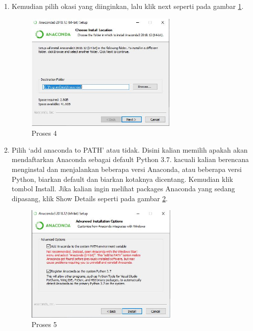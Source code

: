 \begin{itemize}
\begin{enumerate}
\item Kemudian pilih okasi yang diinginkan, lalu klik next seperti pada gambar \ref{gambar4}.
\begin{figure}[ht]
	\centerline{\includegraphics[width=0.70\textwidth]{figures/1/1144124/d.JPG}}
	\caption{Proses 4 }
	\label{gambar4}
\end{figure}

\item Pilih ‘add anaconda to PATH’ atau tidak. Disini kalian memilih apakah akan mendaftarkan Anaconda sebagai default Python 3.7. kacuali kalian berencana menginstal dan menjalankan beberapa versi Anaconda, atau beberapa versi Python, biarkan default dan biarkan kotaknya dicentang. Kemudian klik tombol Install. Jika kalian ingin melihat packages Anaconda yang sedang dipasang, klik Show Details seperti pada gambar \ref{gambar5}.
\begin{figure}[ht]
	\centerline{\includegraphics[width=0.70\textwidth]{figures/1/1144124/e.JPG}}
	\caption{Proses 5 }
	\label{gambar5}
\end{figure}


\end{enumerate}
\end{itemize}
